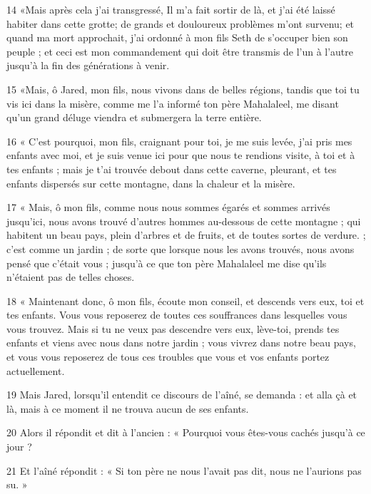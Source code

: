 \par 14 «Mais après cela j'ai transgressé, Il m'a fait sortir de là, et j'ai été laissé habiter dans cette grotte; de ​​grands et douloureux problèmes m'ont survenu; et quand ma mort approchait, j'ai ordonné à mon fils Seth de s'occuper bien son peuple ; et ceci est mon commandement qui doit être transmis de l'un à l'autre jusqu'à la fin des générations à venir.

\par 15 «Mais, ô Jared, mon fils, nous vivons dans de belles régions, tandis que toi tu vis ici dans la misère, comme me l'a informé ton père Mahalaleel, me disant qu'un grand déluge viendra et submergera la terre entière.

\par 16 « C'est pourquoi, mon fils, craignant pour toi, je me suis levée, j'ai pris mes enfants avec moi, et je suis venue ici pour que nous te rendions visite, à toi et à tes enfants ; mais je t'ai trouvée debout dans cette caverne, pleurant, et tes enfants dispersés sur cette montagne, dans la chaleur et la misère.

\par 17 « Mais, ô mon fils, comme nous nous sommes égarés et sommes arrivés jusqu'ici, nous avons trouvé d'autres hommes au-dessous de cette montagne ; qui habitent un beau pays, plein d'arbres et de fruits, et de toutes sortes de verdure. ; c'est comme un jardin ; de sorte que lorsque nous les avons trouvés, nous avons pensé que c'était vous ; jusqu'à ce que ton père Mahalaleel me dise qu'ils n'étaient pas de telles choses.

\par 18 « Maintenant donc, ô mon fils, écoute mon conseil, et descends vers eux, toi et tes enfants. Vous vous reposerez de toutes ces souffrances dans lesquelles vous vous trouvez. Mais si tu ne veux pas descendre vers eux, lève-toi, prends tes enfants et viens avec nous dans notre jardin ; vous vivrez dans notre beau pays, et vous vous reposerez de tous ces troubles que vous et vos enfants portez actuellement.

\par 19 Mais Jared, lorsqu'il entendit ce discours de l'aîné, se demanda : et alla çà et là, mais à ce moment il ne trouva aucun de ses enfants.

\par 20 Alors il répondit et dit à l'ancien : « Pourquoi vous êtes-vous cachés jusqu'à ce jour ?

\par 21 Et l'aîné répondit : « Si ton père ne nous l'avait pas dit, nous ne l'aurions pas su. »

